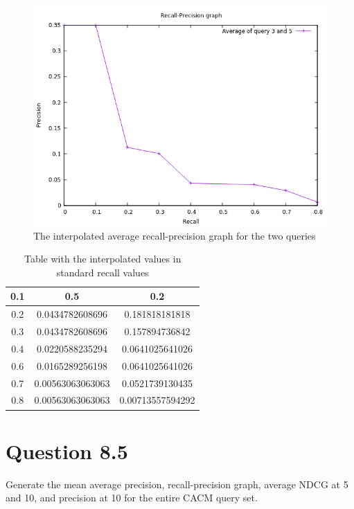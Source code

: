 \documentclass{article}
\begin{document}
	\begin{figure}
		\includegraphics[width=.85\linewidth]{avg_int_q84.png}
		\caption{The interpolated average recall-precision graph for the two queries}
		\label{fig:q84_avg_in}
	\end{figure}
	\begin{table}[h]
		\centering
		\caption{Table with the interpolated values in standard recall values}
		\label{tb:int_values}
		\begin{tabular}{|c|c|c|}
			\hline
			0.1 & 0.5              & 0.2              \\ \hline
			0.2 & 0.0434782608696  & 0.181818181818   \\ \hline
			0.3 & 0.0434782608696  & 0.157894736842   \\ \hline
			0.4 & 0.0220588235294  & 0.0641025641026  \\ \hline
			0.6 & 0.0165289256198  & 0.0641025641026  \\ \hline
			0.7 & 0.00563063063063 & 0.0521739130435  \\ \hline
			0.8 & 0.00563063063063 & 0.00713557594292 \\ \hline
		\end{tabular}
	\end{table}
	\section*{Question 8.5}
	Generate the mean average precision, recall-precision graph, average NDCG at 5 and 10, and precision at 10 for the entire CACM query set.
\end{document}

